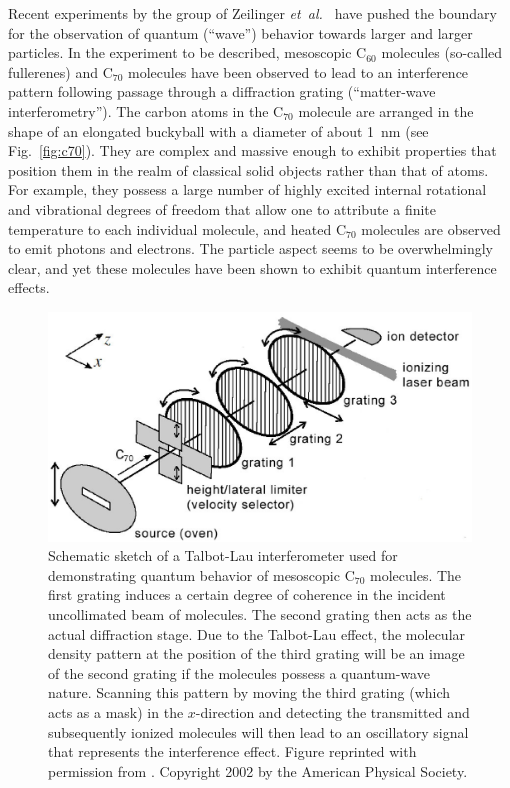 \documentclass[twocolumn,aps,floatfix,amsmath,amssymb,showpacs,nofootinbib]{revtex4}
\newcommand{\etal}{\emph{et~al.\ }}
\begin{document}
Recent experiments by the group of Zeilinger \etal
\cite{Arndt:1999:rc,Brezger:2002:mu,Hackermueller:2002:wb,Arndt:2002:bo,Nairz:2003:um,Hornberger:2003:tv,%
Hackermuller:2003:uu,Hackermuller:2004:rd,Hornberger:2005:mo} have pushed the boundary for the
observation of quantum (``wave'') behavior towards larger and larger
particles. In the experiment to be described, mesoscopic C$_{60}$
molecules (so-called fullerenes) and C$_{70}$ molecules have been
observed to lead to an interference pattern following passage through
a diffraction grating (``matter-wave interferometry'').  The carbon
atoms in the C$_{70}$ molecule are arranged in the shape of an
elongated buckyball with a diameter of about 1~nm (see
Fig.~\ref{fig:c70}). They are complex and massive enough to exhibit
properties that position them in the realm of classical solid objects
rather than that of atoms. For example, they possess a large number of
highly excited internal rotational and vibrational degrees of freedom
that allow one to attribute a finite temperature to each individual
molecule, and heated C$_{70}$ molecules are observed to emit photons
and electrons. The particle aspect seems to be overwhelmingly clear,
and yet these molecules have been shown to exhibit quantum
interference effects.

\begin{figure}
\begin{center}
\includegraphics[scale=.42]{talbotlau-n.eps}
\end{center}
\caption[Schematic sketch of a Talbot-Lau
interferometer]{\label{fig:talbotlau} Schematic sketch of a Talbot-Lau
  interferometer used for demonstrating quantum behavior of mesoscopic
  C$_{70}$ molecules. The first grating induces a certain degree of
  coherence in the incident uncollimated beam of molecules. The second
  grating then acts as the actual diffraction stage. Due to the
  Talbot-Lau effect, the molecular density pattern at the position of
  the third grating will be an image of the second grating if the
  molecules possess a quantum-wave nature. Scanning this pattern by
  moving the third grating (which acts as a mask) in the $x$-direction
  and detecting the transmitted and subsequently ionized molecules
  will then lead to an oscillatory signal that represents the
  interference effect.  Figure reprinted with permission from
  \cite{Brezger:2002:mu}. Copyright 2002 by the American Physical
  Society.}
\end{figure}
\end{document}
